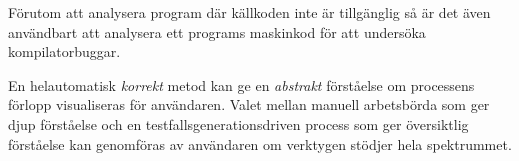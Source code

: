 Förutom att analysera program där källkoden inte är tillgänglig så är det även 
användbart att analysera ett programs maskinkod för att undersöka kompilatorbuggar.





En helautomatisk \textit{korrekt} metod kan ge en \textit{abstrakt} förståelse
om processens förlopp visualiseras för användaren. Valet mellan manuell
arbetsbörda som ger djup förståelse och en testfallsgenerationsdriven process
som ger översiktlig förståelse kan genomföras av användaren om verktygen stödjer
hela spektrummet.

